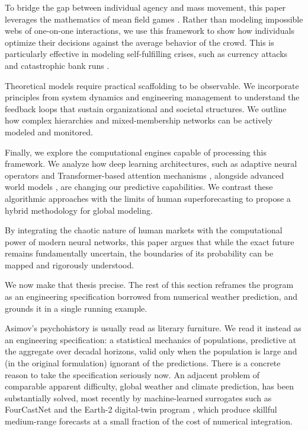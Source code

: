 \documentclass[11pt]{article}
\begin{document}
To bridge the gap between individual agency and mass movement, this paper leverages the mathematics of mean field games \cite{lasrylions2007,carmonadelarue2018,bardifischer2019}. Rather than modeling impossible webs of one-on-one interactions, we use this framework to show how individuals optimize their decisions against the average behavior of the crowd. This is particularly effective in modeling self-fulfilling crises, such as currency attacks \cite{morrisshin1998} and catastrophic bank runs \cite{diamonddybvig1983,goldsteinpauzner2005}.

Theoretical models require practical scaffolding to be observable. We incorporate principles from system dynamics \cite{forrester1961,sterman2000} and engineering management \cite{larson} to understand the feedback loops that sustain organizational and societal structures. We outline how complex hierarchies \cite{simon1962} and mixed-membership networks \cite{airoldi2008} can be actively modeled and monitored.

Finally, we explore the computational engines capable of processing this framework. We analyze how deep learning architectures, such as adaptive neural operators \cite{pathak2022} and Transformer-based attention mechanisms \cite{vaswani2017}, alongside advanced world models \cite{ha2018}, are changing our predictive capabilities. We contrast these algorithmic approaches with the limits of human superforecasting \cite{tetlock2015} to propose a hybrid methodology for global modeling.

By integrating the chaotic nature of human markets with the computational power of modern neural networks, this paper argues that while the exact future remains fundamentally uncertain, the boundaries of its probability can be mapped and rigorously understood.

We now make that thesis precise. The rest of this section reframes the program as an engineering specification borrowed from numerical weather prediction, and grounds it in a single running example.

Asimov's psychohistory is usually read as literary furniture. We read it instead as an engineering specification: a statistical mechanics of populations, predictive at the aggregate over decadal horizons, valid only when the population is large and (in the original formulation) ignorant of the predictions. There is a concrete reason to take the specification seriously now. An adjacent problem of comparable apparent difficulty, global weather and climate prediction, has been substantially solved, most recently by machine-learned surrogates such as FourCastNet and the Earth-2 digital-twin program \cite{pathak2022}, which produce skillful medium-range forecasts at a small fraction of the cost of numerical integration.
\end{document}
